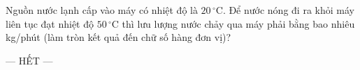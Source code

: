 	\begin{ex}%
		\label{HaTinh-SoGD-Lan1-III6}
		Nguồn nước lạnh cấp vào máy có nhiệt độ là $20\,^\circ\text{C}$. Để nước nóng đi ra khỏi máy liên tục đạt nhiệt độ $50\,^\circ\text{C}$ thì lưu lượng nước chảy qua máy phải bằng bao nhiêu kg/phút (làm tròn kết quả đến chữ số hàng đơn vị)?
		\par
	\end{ex}

	\centerline{--- HẾT ---}



